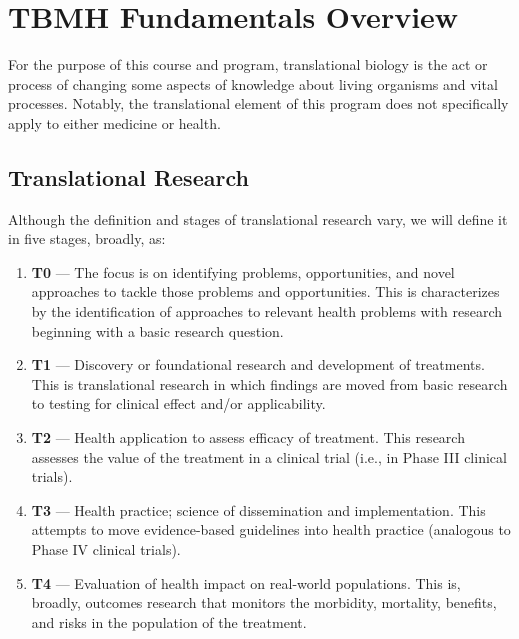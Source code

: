 

\section{TBMH Fundamentals Overview}

For the purpose of this course and program, translational biology is the act or process of changing some aspects of knowledge about living organisms and vital processes. Notably, the translational element of this program does not specifically apply to either medicine or health.

\subsection{Translational Research}
Although the definition and stages of translational research vary, we will define it in five stages, broadly, as:

\begin{enumerate}
	\item \textbf{T0} --- The focus is on identifying problems, opportunities, and novel approaches to tackle those problems and opportunities. This is characterizes by the identification of approaches to relevant health problems with research beginning with a basic research question.
	
	\item \textbf{T1} --- Discovery or foundational research and development of treatments. This is translational research in which findings are moved from basic research to testing for clinical effect and/or applicability.
	
	\item \textbf{T2} --- Health application to assess efficacy of treatment. This research assesses the value of the treatment in a clinical trial (i.e., in Phase III clinical trials).
	
	\item \textbf{T3} --- Health practice; science of dissemination and implementation. This attempts to move evidence-based guidelines into health practice (analogous to Phase IV clinical trials).
	
	\item \textbf{T4} --- Evaluation of health impact on real-world populations. This is, broadly, outcomes research that monitors the morbidity, mortality, benefits, and risks in the population of the treatment.
\end{enumerate}

